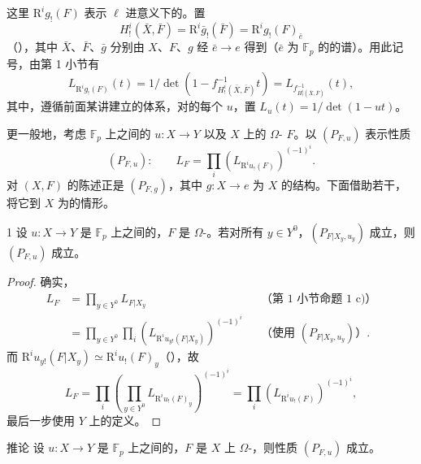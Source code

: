 这里 $\mathrm R^ig_!(F)$ 表示 $\ell$ 进意义下的。置
\[
H_!^i(\bar X,\bar F)=\mathrm R^i\bar g_!(\bar F)=\mathrm R^ig_!(F)_{\bar e}
\]
（），其中
$\bar X$、$\bar F$、$\bar g$ 分别由 $X$、$F$、$g$ 经 $\bar e\to e$ 得到（$\bar e$ 为 $\mathbb F_p$ 的的谱）。用此记号，由第 1 小节有
\[
L_{\mathrm R^ig_!(F)}(t)
=1/\det(1-f_{H_!^i(\bar X,\bar F)}^{-1}t)
=L_{f_{H_!^i(\bar X,\bar F)}^{-1}}(t),
\]
其中，遵循前面某讲建立的体系，对的每个 $u$，置 $L_u(t)=1/\det(1-ut)$。

更一般地，考虑 $\mathbb F_p$ 上之间的 $u:X\to Y$ 以及 $X$ 上的 $\Omega$- $F$。以 $(P_{F,u})$ 表示性质
\[
(P_{F,u}):\qquad L_F=\prod_i(L_{\mathrm R^iu_!(F)})^{(-1)^i}.
\]
对 $(X,F)$ 的陈述正是 $(P_{F,g})$，其中 $g:X\to e$ 为 $X$ 的结构。下面借助若干，将它到 $X$ 为的情形。
\begin{SGAresult}{}{1}
设 $u:X\to Y$ 是 $\mathbb F_p$ 上之间的，$F$ 是 $\Omega$-。若对所有 $y\in Y^0$，$(P_{F|X_y,u_y})$ 成立，则 $(P_{F,u})$ 成立。
\end{SGAresult}
\begin{proof}
确实，
\[
\begin{aligned}
L_F&=\prod_{y\in Y^0}L_{F|X_y}&&\text{（第 1 小节命题 1 c)）}\\
&=\prod_{y\in Y^0}\prod_i(L_{\mathrm R^iu_{y!}(F|X_y)})^{(-1)^i}
&&\text{（使用 $(P_{F|X_y,u_y})$）}.
\end{aligned}
\]
而 $\mathrm R^iu_{y!}(F|X_y)\simeq\mathrm R^iu_!(F)_y$（），故
\[
L_F=\prod_i\left(\prod_{y\in Y^0}L_{\mathrm R^iu_!(F)_y}\right)^{(-1)^i}
=\prod_i(L_{\mathrm R^iu_!(F)})^{(-1)^i},
\]
最后一步使用 $Y$ 上的定义。
\end{proof}
\begin{SGAresult}{推论}{}
设 $u:X\to Y$ 是 $\mathbb F_p$ 上之间的，$F$ 是 $X$ 上 $\Omega$-，则性质 $(P_{F,u})$ 成立。
\end{SGAresult}
